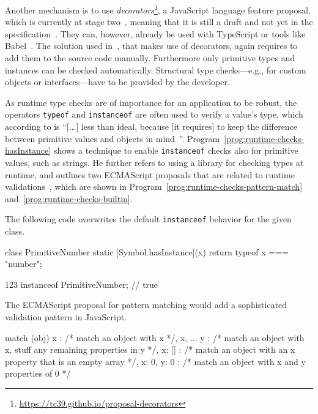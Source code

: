 Another mechanism is to use \textit{decorators\footnote{\url{https://tc39.github.io/proposal-decorators}}},
a JavaScript language feature proposal, which is currently at stage two~\cite{DecoratorsProposalRepo}, meaning that it is still a draft and not yet in the specification~\cite{EcmaScriptProposalProcess}. They can, however, already be used with TypeScript or tools like Babel~\cite{TypeScriptHandbook:Decorators, Babel:Plugins:Decorators}.
The solution used in~\cite{DecoratorTypeChecks}, that makes use of decorators, again requires
to add them to the source code manually. Furthermore only primitive types and instances can be checked automatically. Structural type checks---e.g., for custom objects or interfaces---have
to be provided by the developer.

As runtime type checks are of importance for an application to be robust, the operators \texttt{typeof} and \texttt{instanceof} are often used to verify a value's type, which according to \citeauthor{DynamicTypeChecks:Rauschmayer:2017} is ``[...] less than ideal, because [it requires] to keep the difference between primitive values and objects in mind~\cite{DynamicTypeChecks:Rauschmayer:2017}''. Program~\ref{prog:runtime-checks-hasInstance} shows a technique to enable \texttt{instanceof} checks also for primitive values, such as strings. He further refers to using a library for checking types at runtime, and outlines two ECMAScript proposals that are related to runtime validations~\cite{DynamicTypeChecks:Rauschmayer:2017}, which are shown in Program~\ref{prog:runtime-checks-pattern-match} and~\ref{prog:runtime-checks-builtin}.

\begin{program}
\caption{The following code overwrites the default \texttt{instanceof} behavior for the given class.~\cites{DynamicTypeChecks:Rauschmayer:2017, DynamicTypeChecks:hasInstance}}
\label{prog:runtime-checks-hasInstance}
\begin{JsCode}
class PrimitiveNumber {
  static [Symbol.hasInstance](x) {
    return typeof x === "number";
  }
}

123 instanceof PrimitiveNumber; // true
\end{JsCode}
\end{program}

\begin{program}
\caption{The ECMAScript proposal for pattern matching would add a sophisticated validation pattern in JavaScript.~\cites{DynamicTypeChecks:Rauschmayer:2017, PatternMatchingProposalRepo}}
\label{prog:runtime-checks-pattern-match}
\begin{JsCode}
match (obj) {
  { x }: /* match an object with x */,
  { x, ... y }: /* match an object with x, stuff any remaining properties in y */,
  { x: [] }: /* match an object with an x property that is an empty array */,
  { x: 0, y: 0 }: /* match an object with x and y properties of 0 */
}
\end{JsCode}
\end{program}

